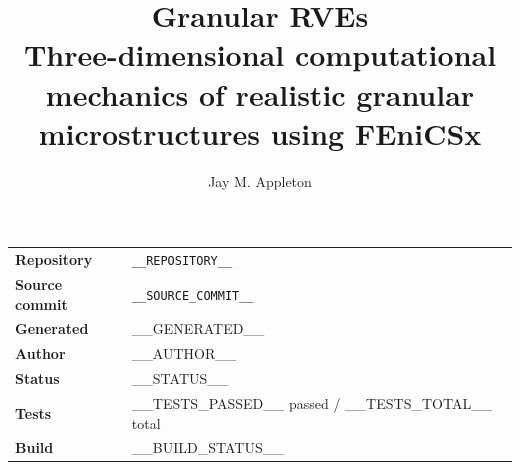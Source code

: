 \documentclass[11pt,a4paper]{article}
\title{Granular RVEs\\
\large Three-dimensional computational mechanics of realistic granular microstructures using FEniCSx}
\author{Jay M. Appleton}
\begin{document}
\maketitle

\begin{center}
\begin{tabular}{ll}
\textbf{Repository} & \texttt{__REPOSITORY__} \\
\textbf{Source commit} & \texttt{__SOURCE_COMMIT__} \\
\textbf{Generated} & __GENERATED__ \\
\textbf{Author} & __AUTHOR__ \\
\textbf{Status} & __STATUS__ \\
\textbf{Tests} & __TESTS_PASSED__ passed / __TESTS_TOTAL__ total \\
\textbf{Build} & __BUILD_STATUS__ \\
\end{tabular}
\end{center}

\tableofcontents













\end{document}
